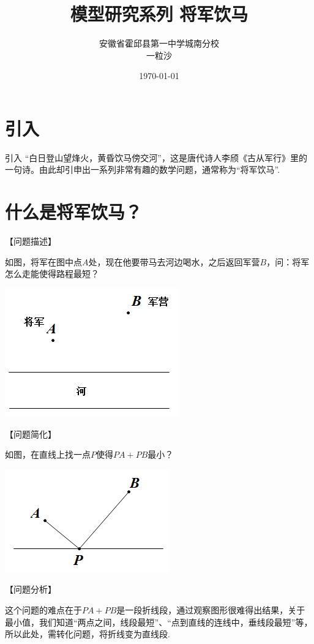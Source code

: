 \documentclass[10pt]{ctexart}
\title{模型研究系列 \quad 将军饮马}
\author{安徽省霍邱县第一中学城南分校\\一粒沙}
\date{\today}
\begin{document}
\maketitle
\tableofcontents


\section{引入}

{引入}
“白日登山望烽火，黄昏饮马傍交河”，这是唐代诗人李颀《古从军行》里的一句诗。由此却引申出一系列非常有趣的数学问题，通常称为“将军饮马”.

\section{什么是将军饮马？}
【问题描述】

如图，将军在图中点$A$处，现在他要带马去河边喝水，之后返回军营$B$，问：将军怎么走能使得路程最短？
\begin{center}
\includegraphics[scale=0.6]{figure/1-1.PNG} 
\end{center}

【问题简化】

如图，在直线上找一点$P$使得$PA+PB$最小？

\includegraphics[scale=0.6]{figure/1-2.PNG} 

【问题分析】

这个问题的难点在于$PA+PB$是一段折线段，通过观察图形很难得出结果，关于最小值，我们知道“两点之间，线段最短”、“点到直线的连线中，垂线段最短”等，所以此处，需转化问题，将折线变为直线段.
\end{document}
